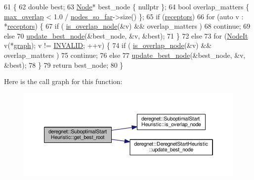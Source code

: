 \begin{DoxyCode}
61                                               \{
62     \textcolor{keywordtype}{double} best;
63     \hyperlink{namespacederegnet_a744bad34f2de9856d36715a445f027f3}{Node}* best\_node \{ \textcolor{keyword}{nullptr} \};
64     \textcolor{keywordtype}{bool} overlap\_matters \{ \hyperlink{classderegnet_1_1SuboptimalStartHeuristic_ab7da09c5dc0c3fd13e19d254319ab3ba}{max\_overlap} < 1.0 / \hyperlink{classderegnet_1_1SuboptimalStartHeuristic_af9a38b598d55b9a1fa22b9f0c141218b}{nodes\_so\_far}->size() \};
65     \textcolor{keywordflow}{if} (\hyperlink{classderegnet_1_1DeregnetStartHeuristic_ab80c046ff2b7c64086fceb84987b3e50}{receptors})
66         \textcolor{keywordflow}{for} (\textcolor{keyword}{auto} v : *\hyperlink{classderegnet_1_1DeregnetStartHeuristic_ab80c046ff2b7c64086fceb84987b3e50}{receptors}) \{
67             \textcolor{keywordflow}{if} ( \hyperlink{classderegnet_1_1SuboptimalStartHeuristic_a911e7e3003bbf92b170a943e714b014e}{is\_overlap\_node}(&v) && overlap\_matters )
68                 \textcolor{keywordflow}{continue};
69             \textcolor{keywordflow}{else}
70                 \hyperlink{classderegnet_1_1DeregnetStartHeuristic_a50179ff9db4d416b93ff41d1dcee1358}{update\_best\_node}(&best\_node, &v, &best);
71         \}
72     \textcolor{keywordflow}{else}
73         \textcolor{keywordflow}{for} (\hyperlink{namespacederegnet_ac34314e1b5f456fc6d1bb9d96316de4a}{NodeIt} v(*\hyperlink{classderegnet_1_1DeregnetStartHeuristic_a4da8e53fc7c0fa3dbe0e3ef07296d75e}{graph}); v != \hyperlink{usinglemon_8h_adf770fe2eec438e3758ffe905dbae208}{INVALID}; ++v) \{
74             \textcolor{keywordflow}{if} ( \hyperlink{classderegnet_1_1SuboptimalStartHeuristic_a911e7e3003bbf92b170a943e714b014e}{is\_overlap\_node}(&v) && overlap\_matters )
75                 \textcolor{keywordflow}{continue};
76             \textcolor{keywordflow}{else}
77                 \hyperlink{classderegnet_1_1DeregnetStartHeuristic_a50179ff9db4d416b93ff41d1dcee1358}{update\_best\_node}(&best\_node, &v, &best);
78         \}
79     \textcolor{keywordflow}{return} best\_node;
80 \}
\end{DoxyCode}


Here is the call graph for this function\+:\nopagebreak
\begin{figure}[H]
\begin{center}
\leavevmode
\includegraphics[width=350pt]{classderegnet_1_1SuboptimalStartHeuristic_aaa8bad0a658a0e1de5e849a5fb58aa21_cgraph}
\end{center}
\end{figure}


